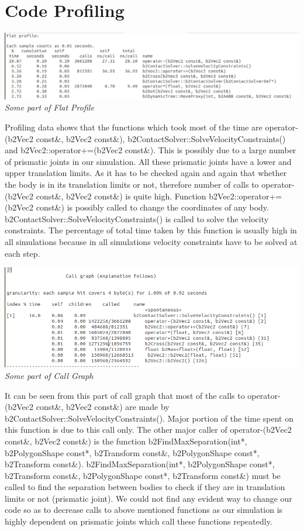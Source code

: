 \documentclass[11pt]{article}
\begin{document}
\section{Code Profiling}
\begin{center}
 \includegraphics[scale=0.5]{./images/prof1}
 \it Some part of Flat Profile
 \end{center}
 Profiling data shows that the functions which took most of the time are \textsf{operator-(b2Vec2 const\&, b2Vec2 const\&)}, \textsf{b2ContactSolver::SolveVelocityConstraints()}
 and \textsf{b2Vec2::operator+=(b2Vec2 const\&)}. This is possibly due to a large number of prismatic joints in our simulation. All these prismatic joints have a lower and upper 
 translation limits. As it has to be checked again and again that whether the body is in its translation limits or not, therefore number of calls to \textsf{operator-(b2Vec2 const\&, b2Vec2 const\&)} 
 is quite high. Function \textsf{b2Vec2::operator+=(b2Vec2 const\&)} is possibly called to change the coordinates of any body. \textsf{b2ContactSolver::SolveVelocityConstraints()} is called
 to solve the velocity constraints. The percentage of total time taken by this function is  usually high in all simulations because in all simulations velocity constraints have to be
 solved at each step.
 \begin{center}
 \includegraphics[scale=0.5]{./images/prof2}\\
 \it Some part of Call Graph
 \end{center}
 It can be seen from this part of call graph that most of the calls to \textsf{operator-(b2Vec2 const\&, b2Vec2 const\&)} are made by \textsf{b2ContactSolver::SolveVelocityConstraints()}.
  Major portion of the time spent on this function is due to this call only. The other major caller of \textsf{operator-(b2Vec2 const\&, b2Vec2 const\&)} 
  is the function \textsf{b2FindMaxSeparation(int*, b2PolygonShape const*, b2Transform const\&, b2PolygonShape const*, b2Transform const\&)}. \textsf{b2FindMaxSeparation(int*, b2PolygonShape const*, b2Transform const\&, b2PolygonShape const*, b2Transform const\&)}
   must be called to find the separation between bodies to check if they are in translation limits or not (prismatic joint).
   We could not find any evident way to change our code so as to decrease calls to above mentioned functions as our simulation is highly dependent on prismatic joints which call
   these functions repeatedly. 
 

 
\end{document}
